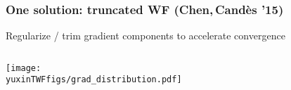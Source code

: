 \documentclass[compress,
mathserif,wide,%
]{beamer}
\newcommand{\yuxinTWFfigs}{figure}
\begin{document}
\begin{frame}
\frametitle{One solution: truncated WF (Chen,\,Cand\`es '15)}


Regularize / trim gradient components to accelerate convergence


\vfill
\begin{columns}


\begin{column}{0.6\textwidth}
\centering
\texttt{[image: \\yuxinTWFfigs/grad\_distribution.pdf]} \\
\end{column}

\end{columns}



%


\end{frame}
\end{document}
